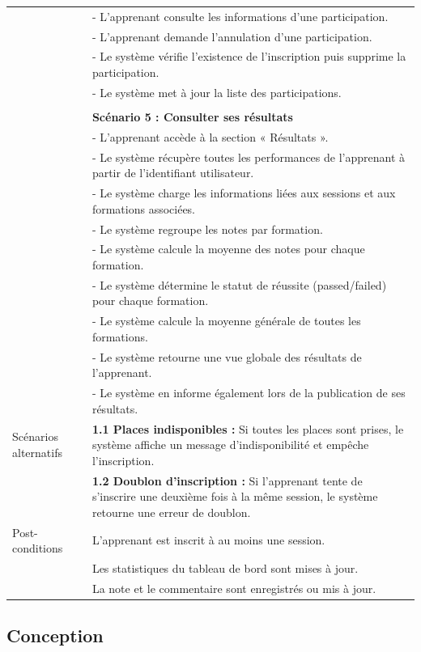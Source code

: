 {\begin{longtable}{|l|p{12cm}|}
&- L'apprenant consulte les informations d'une participation. \\
&- L'apprenant demande l'annulation d'une participation. \\
&- Le système vérifie l'existence de l'inscription puis supprime la participation. \\
&- Le système met à jour la liste des participations. \\
\\
& \textbf{Scénario 5 : Consulter ses résultats} \\
&- L'apprenant accède à la section « Résultats ». \\
&- Le système récupère toutes les performances de l'apprenant à partir de l'identifiant utilisateur. \\
&- Le système charge les informations liées aux sessions et aux formations associées. \\
&- Le système regroupe les notes par formation. \\
&- Le système calcule la moyenne des notes pour chaque formation. \\
&- Le système détermine le statut de réussite (passed/failed) pour chaque formation. \\
&- Le système calcule la moyenne générale de toutes les formations. \\
&- Le système retourne une vue globale des résultats de l'apprenant. \\
&- Le système en informe également lors de la publication de ses résultats.\\

\hline

Scénarios alternatifs &
\textbf{1.1 Places indisponibles :} Si toutes les places sont prises, le système affiche un message d'indisponibilité et empêche l'inscription. \\
& \textbf{1.2 Doublon d'inscription :} Si l'apprenant tente de s'inscrire une deuxième fois à la même session, le système retourne une erreur de doublon. \\
\hline
Post-conditions &
L'apprenant est inscrit à au moins une session. \\
& Les statistiques du tableau de bord sont mises à jour. \\
& La note et le commentaire sont enregistrés ou mis à jour. \\
\hline

\end{longtable}
}
\subsection{Conception}

